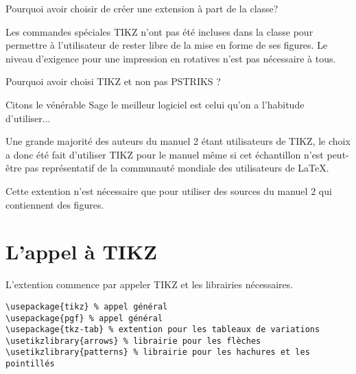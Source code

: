 \documentclass[nocrop]{sesamanuel}
\begin{document}
\begin{autoeval}
 \begin{exercice}
 Pourquoi avoir choisir de créer une extension à part de la classe?
 \end{exercice}
 \begin{corrige}
Les commandes spéciales TIKZ n'ont pas été incluses dans la classe pour permettre à l'utilisateur de rester libre de la mise en forme de ses figures. Le niveau d'exigence pour une impression en rotatives n'est pas nécessaire à tous.
 \end{corrige}

\begin{exercice}
 Pourquoi avoir choisi TIKZ et non pas PSTRIKS ?
\end{exercice}
\begin{corrige}
 Citons le vénérable Sage \og le meilleur logiciel est celui qu'on a l'habitude d'utiliser\fg{}... 
 
 Une grande majorité des auteurs du manuel \Logosesa{} 2 étant utilisateurs de TIKZ, le choix a donc été fait d'utiliser TIKZ pour le manuel même si cet échantillon n'est peut-être pas représentatif de la communauté mondiale des utilisateurs de \LaTeX.
\end{corrige}

\end{autoeval}

\cours
\begin{attention}
 Cette extention n'est nécessaire que pour utiliser des sources du manuel \Logosesa{} 2 qui contiennent des figures.
\end{attention}
\section{L'appel à TIKZ}
L'extention commence par appeler TIKZ et les librairies nécessaires.

\begin{verbatim}
\usepackage{tikz} % appel général
\usepackage{pgf} % appel général
\usepackage{tkz-tab} % extention pour les tableaux de variations
\usetikzlibrary{arrows} % librairie pour les flèches
\usetikzlibrary{patterns} % librairie pour les hachures et les pointillés
\end{verbatim}
\end{document}

